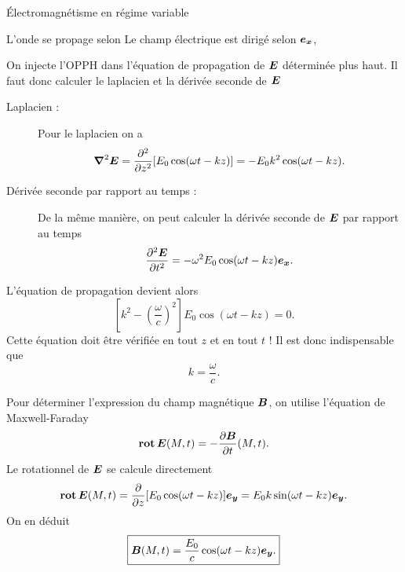 \begin{corr}{Électromagnétisme en régime variable}
\begin{corrlist}
	  \item L'onde se propage selon 
	    Le champ électrique est dirigé selon $\ex$, 

	  \item On injecte l'OPPH dans l'équation de propagation de $\vece$ 
	    déterminée plus haut. Il faut donc calculer le laplacien et 
	    la dérivée seconde de $\vece$
	    \begin{description}
		    \item[Laplacien : ] Pour le laplacien on a
		    \begin{equation*}
			\laplacien \vece = \dd{^2}{z^2}[E_0 \cos(\omega t - k z)]
			= - E_0 k^2 \cos(\omega t - k z).
		    \end{equation*}

	    	\item[Dérivée seconde par rapport au temps : ] De la même manière, 
		 on peut calculer la dérivée seconde de $\vece$ par rapport au temps
		 \begin{equation*}
			 \dd{^2\vece}{t^2} = - \omega^2 E_0 \cos(\omega t - k z)\ex.
	         \end{equation*}
	    \end{description}
	    L'équation de propagation devient alors
	    \begin{equation*}
		    \left[k^2 - \left(\dfrac{\omega}{c}\right)^2\right]
		    E_0 \cos(\omega t - k z) = 0.
	    \end{equation*}
	    Cette équation doit être vérifiée en tout $z$ et en tout $t$ ! Il est 
	    donc indispensable que
	    \begin{equation*}
		    \boxed{
			    k = \dfrac{\omega}{c}.
			  }
	    \end{equation*}

    	   \item Pour déterminer l'expression du champ magnétique $\vecb$, on utilise
      	     l'équation de Maxwell-Faraday
      	     \begin{equation*}
		     \rot \vece(M, t) = - \dd{\vecb}{t}(M, t).
	     \end{equation*}
	     Le rotationnel de $\vece$ se calcule directement
	     \begin{equation*}
		     \rot \vece(M, t) = \dd{}{z} [E_0\cos(\omega t - k z)] \ey
		 	    = E_0 k \sin(\omega t - k z) \ey.
	     \end{equation*}
	     On en déduit
	     \begin{equation*}
		     \boxed{
			     \vecb(M, t) = \dfrac{E_0}{c} \cos(\omega t - k z) \ey.
			   }
	     \end{equation*}


\end{corrlist}
\end{corr}
